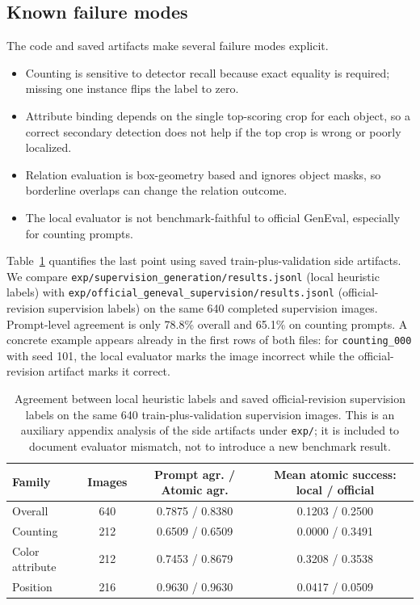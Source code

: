\documentclass{article}
\begin{document}
\subsection{Known failure modes}
The code and saved artifacts make several failure modes explicit.
\begin{itemize}
  \item Counting is sensitive to detector recall because exact equality is required; missing one instance flips the label to zero.
  \item Attribute binding depends on the single top-scoring crop for each object, so a correct secondary detection does not help if the top crop is wrong or poorly localized.
  \item Relation evaluation is box-geometry based and ignores object masks, so borderline overlaps can change the relation outcome.
  \item The local evaluator is not benchmark-faithful to official GenEval, especially for counting prompts.
\end{itemize}

Table~\ref{tab:agreement} quantifies the last point using saved train-plus-validation side artifacts. We compare \texttt{exp/supervision\_generation/results.jsonl} (local heuristic labels) with \texttt{exp/official\_geneval\_supervision/results.jsonl} (official-revision supervision labels) on the same 640 completed supervision images. Prompt-level agreement is only 78.8\% overall and 65.1\% on counting prompts. A concrete example appears already in the first rows of both files: for \texttt{counting\_000} with seed 101, the local evaluator marks the image incorrect while the official-revision artifact marks it correct.

\begin{table}[t]
\caption{Agreement between local heuristic labels and saved official-revision supervision labels on the same 640 train-plus-validation supervision images. This is an auxiliary appendix analysis of the side artifacts under \texttt{exp/}; it is included to document evaluator mismatch, not to introduce a new benchmark result.}
\label{tab:agreement}
\centering
\small
\begin{tabular}{lccc}
\toprule
Family & Images & Prompt agr. / Atomic agr. & Mean atomic success: local / official \\
\midrule
Overall & 640 & 0.7875 / 0.8380 & 0.1203 / 0.2500 \\
Counting & 212 & 0.6509 / 0.6509 & 0.0000 / 0.3491 \\
Color attribute & 212 & 0.7453 / 0.8679 & 0.3208 / 0.3538 \\
Position & 216 & 0.9630 / 0.9630 & 0.0417 / 0.0509 \\
\bottomrule
\end{tabular}
\end{table}
\end{document}
